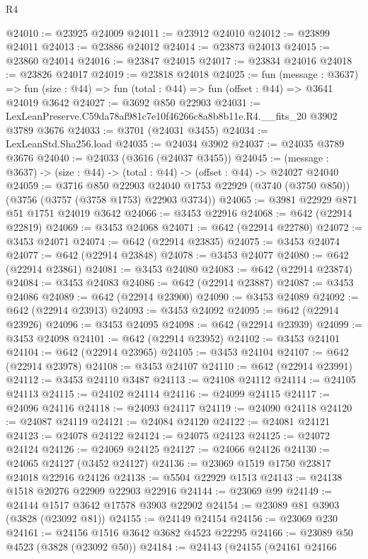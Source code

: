 \begin{lexlean}{R4}
\begin{coremodule}
@24010 := @23925 @24009
@24011 := @23912 @24010
@24012 := @23899 @24011
@24013 := @23886 @24012
@24014 := @23873 @24013
@24015 := @23860 @24014
@24016 := @23847 @24015
@24017 := @23834 @24016
@24018 := @23826 @24017
@24019 := @23818 @24018
@24025 := fun (message : @3637) =>
  fun (size : @44) => fun (total : @44) => fun (offset : @44) => @3641 @24019 @3642
@24027 := @3692 @850 @22903
@24031 := LexLeanPreserve.C59da78af981c7e10f46266c8a8b8b11e.R4.__fits_20 @3902 @3789 @3676
@24033 := @3701 (@24031 @3455)
@24034 := LexLeanStd.Sha256.load
@24035 := @24034 @3902
@24037 := @24035 @3789 @3676
@24040 := @24033 (@3616 (@24037 @3455))
@24045 := (message : @3637) -> (size : @44) -> (total : @44) -> (offset : @44) -> @24027 @24040
@24059 := @3716
    @850
    @22903
    @24040
    @1753
    @22929
    (@3740 (@3750 @850))
    (@3756 (@3757 (@3758 @1753) @22903 @3734))
@24065 := @3981 @22929 @871 @51 @1751 @24019 @3642
@24066 := @3453 @22916
@24068 := @642 (@22914 @22819)
@24069 := @3453 @24068
@24071 := @642 (@22914 @22780)
@24072 := @3453 @24071
@24074 := @642 (@22914 @23835)
@24075 := @3453 @24074
@24077 := @642 (@22914 @23848)
@24078 := @3453 @24077
@24080 := @642 (@22914 @23861)
@24081 := @3453 @24080
@24083 := @642 (@22914 @23874)
@24084 := @3453 @24083
@24086 := @642 (@22914 @23887)
@24087 := @3453 @24086
@24089 := @642 (@22914 @23900)
@24090 := @3453 @24089
@24092 := @642 (@22914 @23913)
@24093 := @3453 @24092
@24095 := @642 (@22914 @23926)
@24096 := @3453 @24095
@24098 := @642 (@22914 @23939)
@24099 := @3453 @24098
@24101 := @642 (@22914 @23952)
@24102 := @3453 @24101
@24104 := @642 (@22914 @23965)
@24105 := @3453 @24104
@24107 := @642 (@22914 @23978)
@24108 := @3453 @24107
@24110 := @642 (@22914 @23991)
@24112 := @3453 @24110 @3487
@24113 := @24108 @24112
@24114 := @24105 @24113
@24115 := @24102 @24114
@24116 := @24099 @24115
@24117 := @24096 @24116
@24118 := @24093 @24117
@24119 := @24090 @24118
@24120 := @24087 @24119
@24121 := @24084 @24120
@24122 := @24081 @24121
@24123 := @24078 @24122
@24124 := @24075 @24123
@24125 := @24072 @24124
@24126 := @24069 @24125
@24127 := @24066 @24126
@24130 := @24065 @24127 (@3452 @24127)
@24136 := @23069 @1519 @1750 @23817 @24018 @22916 @24126
@24138 := @5504 @22929 @1513
@24143 := @24138 @1518 @20276 @22909 @22903 @22916
@24144 := @23069 @99
@24149 := @24144 @1517 @3642 @17578 @3903 @22902
@24154 := @23089 @81 @3903 (@3828 (@23092 @81))
@24155 := @24149 @24154
@24156 := @23069 @230
@24161 := @24156 @1516 @3642 @3682 @4523 @22295
@24166 := @23089 @50 @4523 (@3828 (@23092 @50))
@24184 := @24143
    (@24155
      (@24161
        @24166

\end{coremodule}
\end{lexlean}
